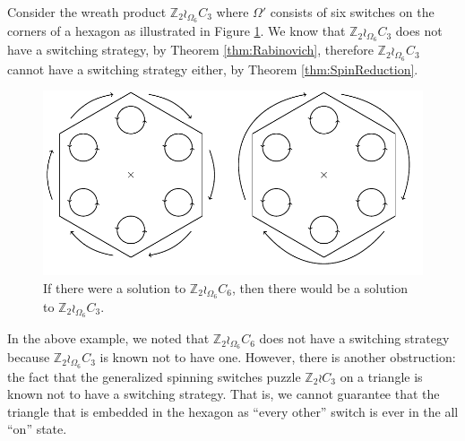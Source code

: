 \begin{example}
  Consider the wreath product $\mathbb Z_2 \wr_{\Omega_6} C_3$ where
  $\Omega'$ consists of six switches on the corners of a hexagon as
  illustrated in Figure \ref{fig:Z2C6}.
  We know that $\mathbb Z_2 \wr_{\Omega_6} C_3$ does not have a switching
  strategy, by Theorem \ref{thm:Rabinovich}, therefore
  $\mathbb Z_2 \wr_{\Omega_6} C_3$ cannot have a switching strategy either, by
  Theorem \ref{thm:SpinReduction}.
\end{example}

\begin{figure}
  \center
  \includegraphics{assets/tikz_Z2C6.pdf}
  \caption[A reduction from $60^\circ$ rotations to $120^\circ$ rotations.]{
    If there were a solution to $\mathbb Z_2 \wr_{\Omega_6} C_6$,
  then there would be a solution to $\mathbb Z_2 \wr_{\Omega_6} C_3$.
  }
\label{fig:Z2C6}
\end{figure}

In the above example, we noted that $\mathbb Z_2 \wr_{\Omega_6} C_6$ does
not have a switching strategy because $\mathbb Z_2 \wr_{\Omega_6} C_3$ is
known not to have one. However, there is another obstruction: the fact that
the generalized spinning switches puzzle $\mathbb Z_2 \wr C_3$ on a triangle
is known not to have a switching strategy. That is, we cannot guarantee that
the triangle that is embedded in the hexagon as ``every other'' switch
is ever in the all ``on'' state.

